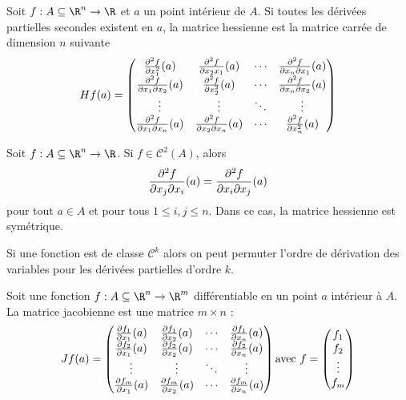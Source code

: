 \begin{mydef}
	Soit $f : A \subseteq \R^n \to \R$ et $a$ un point intérieur de $A$. Si toutes les dérivées partielles secondes existent en $a$, la matrice hessienne est la matrice carrée de dimension $n$ suivante
	\[ Hf(a) = \begin{pmatrix}
		\frac{\partial^2 f}{\partial x_1^2}(a) & \frac{\partial^2 f}{\partial x_2 x_1}(a) & \cdots & \frac{\partial^2 f}{\partial x_n \partial x_1}(a) \\
		\frac{\partial^2 f}{\partial x_1 \partial x_2}(a) & \frac{\partial^2 f}{\partial x_2^2}(a) & \cdots & \frac{\partial^2 f}{\partial x_n \partial x_2}(a) \\
		\vdots & \vdots & \ddots & \vdots \\
		\frac{\partial^2 f}{\partial x_1 \partial x_n}(a) & \frac{\partial^2 f}{\partial x_2 \partial x_n}(a) & \cdots & \frac{\partial^2 f}{\partial x_n^2}(a) \\
	\end{pmatrix} \]
\end{mydef}

\begin{myprop}
	Soit $f : A \subseteq \R^n \to \R$.
	Si $f \in \mathcal{C}^2(A)$, alors
	\[ \frac{\partial^2 f}{\partial x_j \partial x_i}(a) = \frac{\partial^2 f}{\partial x_i \partial x_j}(a) \]
	pour tout $a \in A$ et pour tous $1 \leq i,j \leq n$. Dans ce cas, la matrice hessienne est symétrique.
\end{myprop}

\begin{myprop}
	Si une fonction est de classe $\mathcal{C}^k$ alors on peut permuter l'ordre de dérivation des variables pour les dérivées partielles d'ordre $k$.
\end{myprop}

\begin{mydef}
	Soit une fonction $f : A \subseteq \R^n \to \R^m$ différentiable en un point $a$ intérieur à $A$. La matrice jacobienne est une matrice $m \times n$ :
	\[ Jf(a) =
	\begin{pmatrix}
		\frac{\partial f_1}{\partial x_1}(a) & \frac{\partial f_1}{\partial x_2}(a) & \cdots & \frac{\partial f_1}{\partial x_n}(a) \\
		\frac{\partial f_2}{\partial x_1}(a) & \frac{\partial f_2}{\partial x_2}(a) & \cdots & \frac{\partial f_2}{\partial x_n}(a) \\
		\vdots & \vdots & \ddots & \vdots \\
		\frac{\partial f_m}{\partial x_1}(a) & \frac{\partial f_m}{\partial x_2}(a) & \cdots & \frac{\partial f_m}{\partial x_n}(a) \\
	\end{pmatrix} \text{avec } f =
	\begin{pmatrix}
		f_1 \\ f_2 \\ \vdots \\ f_m
	\end{pmatrix} \]
\end{mydef}

